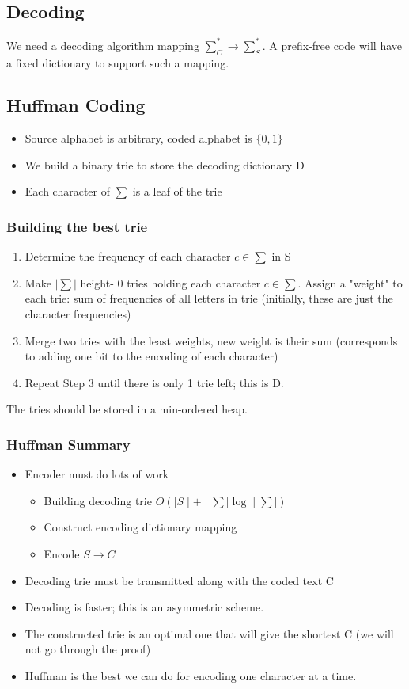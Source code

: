 \documentclass{article}
\begin{document}
\subsection*{Decoding}
We need a decoding algorithm mapping \(\sum_C^* \rightarrow \sum_S^*\). A prefix-free code will have a fixed dictionary to support such a mapping. 

\subsection*{Huffman Coding}
\begin{itemize}
\item Source alphabet is arbitrary, coded alphabet is \(\{0,1\}\)
\item We build a binary trie to store the decoding dictionary D
\item Each character of \(\sum\) is a leaf of the trie
\end{itemize}

\subsubsection*{Building the best trie}
\begin{enumerate}
\item Determine the frequency of each character \(c \in \sum\) in S
\item Make \(\mid \sum \mid \) height- 0 tries holding each character \(c \in \sum\).
Assign a "weight" to each trie: sum of frequencies of all letters in trie
(initially, these are just the character frequencies)
\item Merge two tries with the least weights, new weight is their sum
(corresponds to adding one bit to the encoding of each character)
\item Repeat Step 3 until there is only 1 trie left; this is D.
\end{enumerate}
The tries should be stored in a min-ordered heap. 

\subsubsection*{Huffman Summary}
\begin{itemize}
\item Encoder must do lots of work 
\begin{itemize}
\item Building decoding trie \(O(\mid S \mid + \mid \sum \mid \log \mid \sum \mid)\)
\item Construct encoding dictionary mapping
\item Encode \(S \rightarrow C\)
\end{itemize}
\item Decoding trie must be transmitted along with the coded text C
\item Decoding is faster; this is an asymmetric scheme.
\item The constructed trie is an optimal one that will give the shortest C
(we will not go through the proof)
\item Huffman is the best we can do for encoding one character at a time.
\end{itemize}
\end{document}
